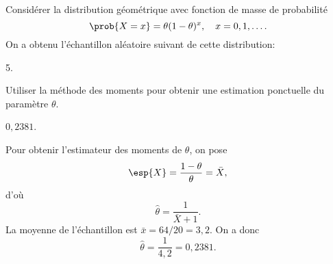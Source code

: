 \begin{exercice}
  Considérer la distribution géométrique avec fonction de masse de
  probabilité
  \begin{displaymath}
    \prob{X = x} = \theta (1 - \theta)^x, \quad x = 0, 1, \dots.
  \end{displaymath}
  On a obtenu l'échantillon aléatoire suivant de cette distribution:
  \begin{center}
    5.
  \end{center}
  Utiliser la méthode des moments pour obtenir une estimation
  ponctuelle du paramètre $\theta$.
  \begin{rep}
    $0,2381$.
  \end{rep}
  \begin{sol}
    Pour obtenir l'estimateur des moments de $\theta$, on pose
    \begin{equation*}
      \esp{X} = \frac{1 - \theta}{\theta} = \bar{X},
    \end{equation*}
    d'où
    \begin{equation*}
      \hat{\theta} = \frac{1}{\bar{X} + 1}.
    \end{equation*}
    La moyenne de l'échantillon est $\bar{x} = 64/20 = 3,2$. On a donc
    \begin{equation*}
      \hat{\theta} = \frac{1}{4,2} = 0,2381.
    \end{equation*}
  \end{sol}
\end{exercice}

